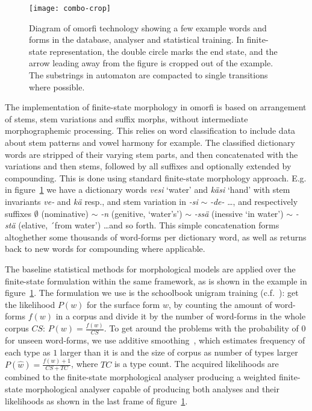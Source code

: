 \documentclass[a4paper,12pt]{article}
\begin{document}
\begin{figure}[tb!]
    \texttt{[image: combo-crop]}
    \caption{Diagram of omorfi technology showing a
        few example words and forms in the database,
        analyser and statistical training. In
        finite-state representation, the double
        circle marks the end state, and the arrow
        leading away from the figure is cropped out
        of the example. The substrings in automaton
        are compacted to single transitions where
    possible. \label{fig:combo}}
\end{figure}

The implementation of finite-state morphology in omorfi is based on
arrangement of stems, stem variations and suffix morphs, without
intermediate morphographemic processing. This relies on word classification
to include data about stem patterns and vowel harmony for example. The
classified dictionary words are stripped of their varying stem parts, and
then concatenated with the variations and then stems, followed by all
suffixes and optionally extended by compounding. This is done using standard
finite-state morphology approach. E.g.  in figure~\ref{fig:combo} we have a
dictionary words \textit{vesi} `water' and \textit{käsi} `hand' with stem
invariants \textit{ve-} and \textit{kä} resp., and stem variation in
\textit{-si} $\sim$ \textit{-de-} \ldots, and respectively suffixes
$\emptyset$ (nominative) $\sim$ \textit{-n} (genitive, `water's') $\sim$
\textit{-ssä} (inessive `in water')  $\sim$ \textit{-stä} (elative, ´from
water') \ldots and so forth. This simple concatenation forms altoghether
some thousands of word-forms per dictionary word, as well as returns back to
new words for compounding where applicable.

The baseline statistical methods for morphological models are applied over
the finite-state formulation within the same framework, as is shown in the
example in figure~\ref{fig:combo}.  The formulation we use is the schoolbook
unigram training (c.f.~\cite{manning1999foundations}): get the likelihood $P(w)$ for the
surface form $w$, by counting the amount of word-forms $f(w)$ in a corpus
and divide it by the number of word-forms in the whole corpus $CS$: $P(w) =
\frac{f(w)}{CS}$.  To get around the problems with the probability of $0$
for unseen word-forms, we use additive smoothing~\citep{chen1999empirical},
which estimates frequency of each type as $1$ larger than it is and the size
of corpus as number of types larger $P(\hat w) = \frac{f(w) + 1}{CS + TC}$,
where $TC$ is a type count. The acquired likelihoods are combined to the
finite-state morphological analyser producing a weighted finite-state
morphological analyser capable of producing both analyses and their
likelihoods as shown in the last frame of figure~\ref{fig:combo}.
\end{document}
